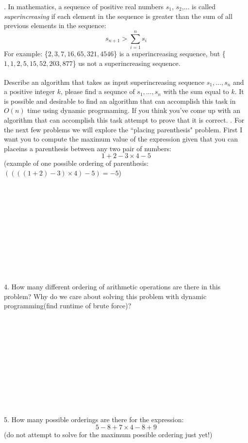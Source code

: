 \documentclass[12pt]{article}
\begin{document}
\newpage
{}. In mathematics, a sequence of positive real numbers 
$s_1$, $s_2$,$\dots$ is called \textit{superincreasing} if each element
in the sequence is greater than the sum of all previous elements in the sequence:
$$s_{n+1} > \sum\limits_{i=1}^{n}s_i$$
For example: \{$2,3,7,16,65,321,4546$\} is a superincreasing sequence, 
but \{$1,1,2,5,15,52,203,877$\} us not a superincreasing sequence.\\\\
Describe an algorithm that takes as input superincreasing sequence $s_1,\dots,s_n$ and a positive 
integer $k$, please find a sequnce of $s_1,\dots,s_n$ with the sum equal
to $k$. It is possible and desirable to find an algorithm that can accomplish this
task in $O(n)$ time using dynamic progrmaming. If you think you've come up with an
algorithm that can accomplish this task attempt to prove that it is correct.
\newpage
{}. For the next few problems we will explore the ``placing parenthesis" problem. First
I want you to compute the maximum value of the expression given that you can placeins
a parenthesis between any two pair of numbers:\\
$$1+2-3 \times 4-5$$
(example of one possible ordering of parenthesis:$((((1+2)-3) \times 4)-5)=-5$)\\\\\\\\\\\\\\\\\\\\\\\\
4. How many different ordering of arithmetic operations are there in this problem? 
Why do we care about solving this problem with dynamic programming(find runtime of brute force)?\\\\\\\\\\\\\\\\\\\\\\\\
5. How many possible orderings are there for the expression: $$5-8+7 \times 4 - 8 + 9$$ 
(do not attempt to solve for the maximum possible ordering just yet!)
\end{document}
